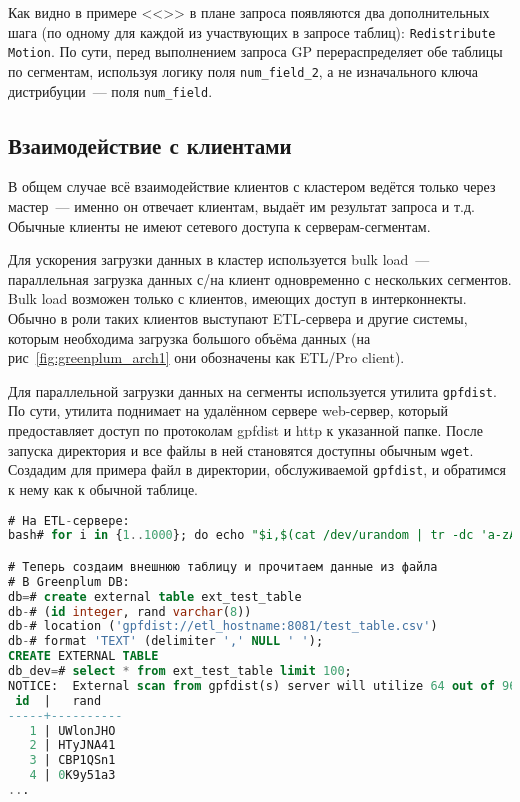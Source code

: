 Как видно в примере <<>> в плане запроса появляются два дополнительных шага (по одному для каждой из участвующих в запросе таблиц): \lstinline!Redistribute Motion!. По сути, перед выполнением запроса GP перераспределяет обе таблицы по сегментам, используя логику поля \lstinline!num_field_2!, а не изначального ключа дистрибуции~--- поля \lstinline!num_field!.


\subsection{Взаимодействие с клиентами}

В общем случае всё взаимодействие клиентов с кластером ведётся только через мастер~--- именно он отвечает клиентам, выдаёт им результат запроса и т.д. Обычные клиенты не имеют сетевого доступа к серверам-сегментам.

Для ускорения загрузки данных в кластер используется bulk load~--- параллельная загрузка данных с/на клиент одновременно с нескольких сегментов. Bulk load возможен только с клиентов, имеющих доступ в интерконнекты. Обычно в роли таких клиентов выступают ETL-сервера и другие системы, которым необходима загрузка большого объёма данных (на рис~\ref{fig:greenplum_arch1} они обозначены как ETL/Pro client).

Для параллельной загрузки данных на сегменты используется утилита \lstinline!gpfdist!. По сути, утилита поднимает на удалённом сервере web-сервер, который предоставляет доступ по протоколам gpfdist и http к указанной папке. После запуска директория и все файлы в ней становятся доступны обычным \lstinline!wget!. Создадим для примера файл в директории, обслуживаемой \lstinline!gpfdist!, и обратимся к нему как к обычной таблице.

\begin{lstlisting}[language=SQL,label=lst:greenplum_example4,caption=Пример с gpfdist]
# На ETL-сервере:
bash# for i in {1..1000}; do echo "$i,$(cat /dev/urandom | tr -dc 'a-zA-Z0-9' | fold -w 8 | head -n 1)"; done > /tmp/work/gpfdist_home/test_table.csv

# Теперь создаим внешнюю таблицу и прочитаем данные из файла
# В Greenplum DB:
db=# create external table ext_test_table
db-# (id integer, rand varchar(8))
db-# location ('gpfdist://etl_hostname:8081/test_table.csv')
db-# format 'TEXT' (delimiter ',' NULL ' ');
CREATE EXTERNAL TABLE
db_dev=# select * from ext_test_table limit 100;
NOTICE:  External scan from gpfdist(s) server will utilize 64 out of 96 segment databases
 id  |   rand
-----+----------
   1 | UWlonJHO
   2 | HTyJNA41
   3 | CBP1QSn1
   4 | 0K9y51a3
...
\end{lstlisting}

